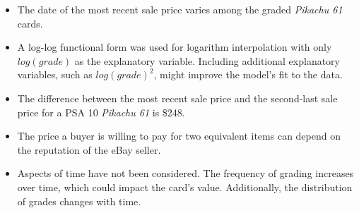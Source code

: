 \documentclass{article}
\begin{document}
\begin{itemize}
    \item The date of the most recent sale price varies among the graded \textit{Pikachu 61} cards.
    \item A log-log functional form was used for logarithm interpolation with only $log(grade)$ as the explanatory variable. Including additional explanatory variables, such as $log(grade)^2$, might improve the model's fit to the data.
    \item The difference between the most recent sale price and the second-last sale price for a PSA 10 \textit{Pikachu 61} is \$248.
    \item The price a buyer is willing to pay for two equivalent items can depend on the reputation of the eBay seller.  
    \item Aspects of time have not been considered. The frequency of grading increases over time, which could impact the card's value. Additionally, the distribution of grades changes with time.
\end{itemize}
\end{document}
